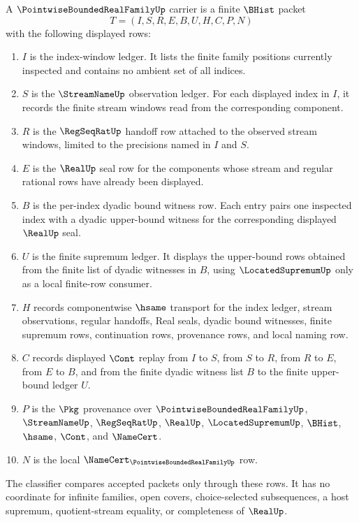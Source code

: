 \begin{definition}
\label{def:pointwise-bounded-real-family-carrier}
A $\PointwiseBoundedRealFamilyUp$ carrier is a finite $\BHist$ packet
$$
T=(I,S,R,E,B,U,H,C,P,N)
$$
with the following displayed rows:
\begin{enumerate}
\item $I$ is the index-window ledger. It lists the finite family positions currently inspected and contains no ambient set of all indices.
\item $S$ is the $\StreamNameUp$ observation ledger. For each displayed index in $I$, it records the finite stream windows read from the corresponding component.
\item $R$ is the $\RegSeqRatUp$ handoff row attached to the observed stream windows, limited to the precisions named in $I$ and $S$.
\item $E$ is the $\RealUp$ seal row for the components whose stream and regular rational rows have already been displayed.
\item $B$ is the per-index dyadic bound witness row. Each entry pairs one inspected index with a dyadic upper-bound witness for the corresponding displayed $\RealUp$ seal.
\item $U$ is the finite supremum ledger. It displays the upper-bound rows obtained from the finite list of dyadic witnesses in $B$, using $\LocatedSupremumUp$ only as a local finite-row consumer.
\item $H$ records componentwise $\hsame$ transport for the index ledger, stream observations, regular handoffs, Real seals, dyadic bound witnesses, finite supremum rows, continuation rows, provenance rows, and local naming row.
\item $C$ records displayed $\Cont$ replay from $I$ to $S$, from $S$ to $R$, from $R$ to $E$, from $E$ to $B$, and from the finite dyadic witness list $B$ to the finite upper-bound ledger $U$.
\item $P$ is the $\Pkg$ provenance over $\PointwiseBoundedRealFamilyUp$, $\StreamNameUp$, $\RegSeqRatUp$, $\RealUp$, $\LocatedSupremumUp$, $\BHist$, $\hsame$, $\Cont$, and $\NameCert$.
\item $N$ is the local $\NameCert_{\PointwiseBoundedRealFamilyUp}$ row.
\end{enumerate}
The classifier compares accepted packets only through these rows. It has no coordinate for infinite families, open covers, choice-selected subsequences, a host supremum, quotient-stream equality, or completeness of $\RealUp$.
\end{definition}

